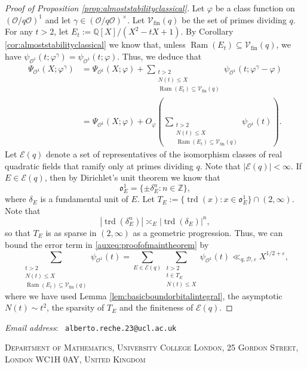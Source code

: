 \documentclass{article}
\theoremstyle{named}
\newcommand{\D}{\mathcal{D}}
\newcommand{\E}{\mathcal{E}}
\newcommand{\Z}{\mathbb{Z}}
\newcommand{\Q}{\mathbb{Q}}
\renewcommand{\O}{\mathcal{O}}
\renewcommand{\o}{\mathfrak{o}}
\newcommand{\Primes}{\mathcal{V}_{\text{fin}}}
\DeclareMathOperator{\Ram}{Ram}
\DeclareMathOperator{\trd}{trd}
\begin{document}
\begin{proof}[Proof of Proposition \ref{prop:almoststabilityclassical}]

Let $\varphi$ be a class function on $(\O/q\O)^1$ and let $\gamma \in (\O/q\O)^\times$. 
Let $\Primes(q)$ be the set of primes dividing $q$. For any $t > 2$, let $E_t := \Q[X]/(X^2 - tX + 1)$. By Corollary \ref{cor:almoststabilityclassical} we know that, unless  $\Ram(E_t) \subseteq \Primes(q)$, we have $\psi_{\O^1}(t; \varphi^\gamma) = \psi_{\O^1}(t;\varphi)$. Thus, we deduce that 
\begin{equation}\label{auxeq:proofofmaintheorem}
\begin{aligned}
    \Psi_{\O^1}(X; \varphi^\gamma) & = \Psi_{\O^1}(X; \varphi) + \sum_{\substack{t > 2\\
    N(t) \leq X\\ \Ram(E_t) \subseteq \Primes(q)}}\psi_{\O^1}(t; \varphi^\gamma - \varphi)\\\
    & = \Psi_{\O^1}(X; \varphi) +  O_\varphi\left(\sum_{\substack{t > 2\\
    N(t) \leq X\\ \Ram(E_t) \subseteq \Primes(q)}} \psi_{\O^1}(t)\right).
\end{aligned}
\end{equation}
Let $\E(q)$ denote a set of representatives of the isomorphism classes of real quadratic fields that ramify only at primes dividing $q$. Note that $|\E(q)| < \infty$. If $E \in \E(q)$, then by Dirichlet's unit theorem we know that
\begin{equation*}
    \o_E^1 = \{\pm \delta_E^n : n \in \Z\},
\end{equation*}  
where $\delta_E$ is a fundamental unit of $E$. Let $T_E := \{\trd(x): x \in \o_E^1\} \cap (2, \infty)$. Note that 
\begin{equation*}
  |\trd(\delta_E^n)| \asymp_E |\trd(\delta_E)|^n,
\end{equation*}
so that $T_E$ is as sparse in $(2, \infty)$ as a geometric progression. Thus, we can bound the error term in \eqref{auxeq:proofofmaintheorem} by   
\begin{equation*}
\sum_{\substack{t > 2\\
    N(t) \leq X\\ \Ram(E_t) \subseteq \Primes(q)}} \psi_{\O^1}(t) = \sum_{E \in \E(q)}\sum_{\substack{t > 2\\
    t \in T_E\\ N(t) \leq X}} \psi_{\O^1}(t) \ll_{q, \D, \varepsilon} X^{1/2 + \varepsilon},
\end{equation*}
where we have used Lemma \ref{lem:basicboundorbitalintegral}, the asymptotic $N(t) \sim t^2$, the sparsity of $T_E$ and the finiteness of $\mathcal{E}(q)$.
\end{proof}


\printbibliography


\footnotesize
\textit{Email address}: \, \texttt{alberto.reche.23@ucl.ac.uk}\par\nopagebreak
\textsc{Department of Mathematics, University College London, 25 Gordon Street, London WC1H 0AY, United Kingdom}
\end{document}
